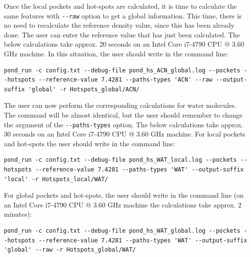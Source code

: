 \documentclass[9pt,tutorial, pubversion]{livecoms}
\begin{document}
Once the local pockets and hot-spots are calculated, it is time to calculate the same features with \texttt{-{}-raw} option to get a global information. This time, there is no need to recalculate the reference density value, since this has been already done. The user can enter the reference value that has just been calculated. The below calculations take approx. 20 seconds on an Intel Core i7-4790 CPU @ 3.60 GHz machine. In this situation, the user should write in the command line:
\begin{lstlisting}
pond_run -c config.txt --debug-file pond_hs_ACN_global.log --pockets --hotspots --reference-value 7.4281 --paths-types 'ACN' --raw --output-suffix 'global' -r Hotspots_global/ACN/ 
\end{lstlisting}
The user can now perform the corresponding calculations for water molecules. The command will be almost identical, but the user should remember to change the argument of the \texttt{-{}-paths-types} option. The below calculations take approx. 30 seconds on an Intel Core i7-4790 CPU @ 3.60 GHz machine. For local pockets and hot-spots the user should write in the command line:
\begin{lstlisting}
pond_run -c config.txt --debug-file pond_hs_WAT_local.log --pockets --hotspots --reference-value 7.4281 --paths-types 'WAT' --output-suffix 'local' -r Hotspots_local/WAT/ 
\end{lstlisting}
For global pockets and hot-spots, the user should write in the command line (on an Intel Core i7-4790 CPU @ 3.60 GHz machine the calculations take approx. 2 minutes):
\begin{lstlisting}
pond_run -c config.txt --debug-file pond_hs_WAT_global.log --pockets --hotspots --reference-value 7.4281 --paths-types 'WAT' --output-suffix 'global' --raw -r Hotspots_global/WAT/ 
\end{lstlisting}
\end{document}
